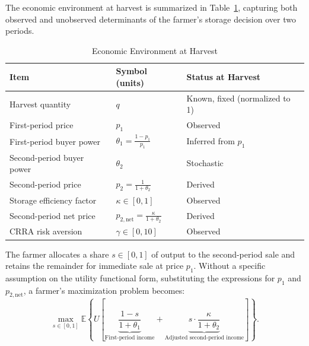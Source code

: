 \noindent The economic environment at harvest is summarized in Table~\ref{tab:baseline model parameter table}, capturing both observed and unobserved determinants of the farmer's storage decision over two periods.

\begin{table}[H]
\centering
\caption{Economic Environment at Harvest}
\label{tab:baseline model parameter table}
\begin{tabular}{lll}
\toprule
\textbf{Item} & \textbf{Symbol (units)} & \textbf{Status at Harvest} \\
\midrule
Harvest quantity & $q$ & Known, fixed (normalized to 1) \\
First-period price & $p_1$ & Observed \\
First-period buyer power & $\theta_1 = \frac{1 - p_1}{p_1}$ & Inferred from $p_1$ \\
Second-period buyer power & $\theta_2$ & Stochastic \\
Second-period price & $p_2 = \frac{1}{1 + \theta_2}$ & Derived \\
Storage efficiency factor & $\kappa \in [0,1]$ & Observed \\
Second-period net price & $p_{2,\text{net}} = \frac{\kappa}{1 + \theta_2}$ & Derived \\
CRRA risk aversion & $\gamma \in [0,10]$ & Observed \\
\bottomrule
\end{tabular}
\end{table}

\noindent The farmer allocates a share $s \in [0,1]$ of output to the second-period sale and retains the remainder for immediate sale at price $p_1$. Without a specific assumption on the utility functional form, substituting the expressions for $p_1$ and $p_{2,\text{net}}$, a farmer's maximization problem becomes:
\begin{equation}
\label{eq:final objective}
\max_{s \in [0,1]} \mathbb{E} \left\{U\left[\underbrace{\frac{1-s}{1+\theta_1}}_{\text{First-period income}} + \underbrace{s \cdot \frac{\kappa}{1+\theta_2}}_{\text{Adjusted second-period income}} \right]\right\}.
\end{equation}


